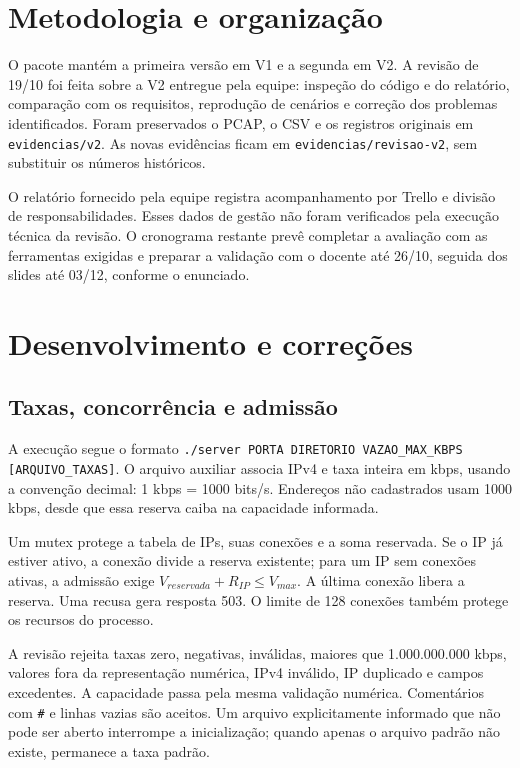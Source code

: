 \documentclass[12pt]{article}
\begin{document}
\section{Metodologia e organização}
O pacote mantém a primeira versão em V1 e a segunda em V2. A revisão de 19/10
foi feita sobre a V2 entregue pela equipe: inspeção do código e do relatório,
comparação com os requisitos, reprodução de cenários e correção dos problemas
identificados. Foram preservados o PCAP, o CSV e os registros originais em
\texttt{evidencias/v2}. As novas evidências ficam em
\texttt{evidencias/revisao-v2}, sem substituir os números históricos.

O relatório fornecido pela equipe registra acompanhamento por Trello e divisão
de responsabilidades. Esses dados de gestão não foram verificados pela execução
técnica da revisão. O cronograma restante prevê completar a avaliação com as
ferramentas exigidas e preparar a validação com o docente até 26/10, seguida dos
slides até 03/12, conforme o enunciado.

\section{Desenvolvimento e correções}
\subsection{Taxas, concorrência e admissão}
A execução segue o formato
\texttt{./server PORTA DIRETORIO VAZAO\_MAX\_KBPS [ARQUIVO\_TAXAS]}.
O arquivo auxiliar associa IPv4 e taxa inteira em kbps, usando a convenção
decimal: 1 kbps = 1000 bits/s. Endereços não cadastrados usam 1000 kbps, desde
que essa reserva caiba na capacidade informada.

Um mutex protege a tabela de IPs, suas conexões e a soma reservada. Se o IP já
estiver ativo, a conexão divide a reserva existente; para um IP sem conexões
ativas, a admissão exige $V_{reservada}+R_{IP}\le V_{max}$. A última conexão
libera a reserva. Uma recusa gera resposta 503. O limite de 128 conexões também
protege os recursos do processo.

A revisão rejeita taxas zero, negativas, inválidas, maiores que
1.000.000.000 kbps, valores fora da representação numérica, IPv4 inválido,
IP duplicado e campos excedentes. A capacidade passa pela mesma validação
numérica. Comentários com \texttt{\#} e linhas vazias são aceitos. Um arquivo
explicitamente informado que não pode ser aberto interrompe a inicialização;
quando apenas o arquivo padrão não existe, permanece a taxa padrão.
\end{document}

